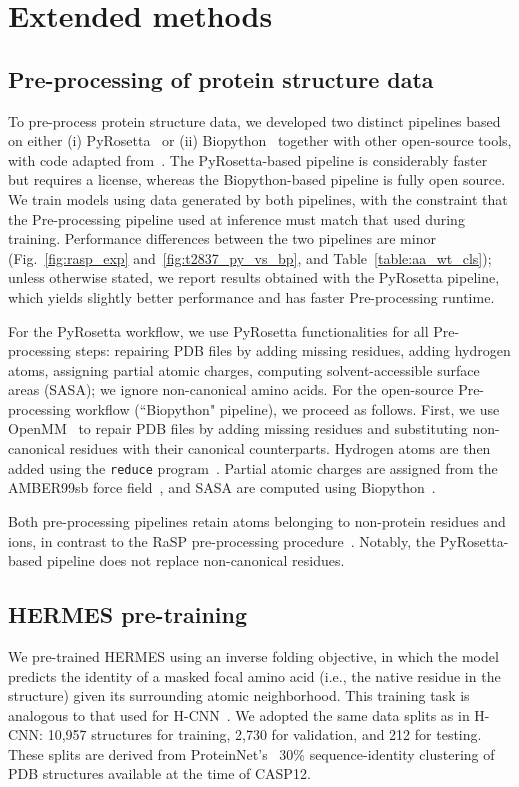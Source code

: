 
\section{Extended methods}


\subsection{Pre-processing of protein structure data}
To pre-process protein structure data, we developed two distinct pipelines based on either (i)
PyRosetta~\citep{chaudhury_pyrosetta_2010} or (ii) Biopython~\citep{cock_biopython_2009} together
with other open-source tools, with code adapted from~\citep{blaabjerg_rapid_2023}. The
PyRosetta-based pipeline is considerably faster but requires a license, whereas the Biopython-based
pipeline is fully open source. We train models using data generated by both pipelines, with the
constraint that the Pre-processing pipeline used at inference must match that used during training.
Performance differences between the two pipelines are minor (Fig.~\ref{fig:rasp_exp}
and~\ref{fig:t2837_py_vs_bp}, and Table~\ref{table:aa_wt_cls}); unless otherwise stated, we report
results obtained with the PyRosetta pipeline, which yields slightly better performance and has
faster Pre-processing runtime.

For the PyRosetta workflow, we use PyRosetta functionalities for all Pre-processing steps: repairing
PDB files by adding missing residues, adding hydrogen atoms, assigning partial atomic charges,
computing solvent-accessible surface areas (SASA); we ignore non-canonical amino acids.
For the open-source Pre-processing workflow (``Biopython" pipeline), we proceed as follows. First,
we use OpenMM~\citep{eastman_openmm_2013} to repair PDB files by adding missing residues and
substituting non-canonical residues with their canonical counterparts. Hydrogen atoms are then added
using the \texttt{reduce} program~\citep{word_asparagine_1999}. Partial atomic charges are assigned
from the AMBER99sb force field~\citep{ponder_force_2003}, and SASA are computed using
Biopython~\citep{cock_biopython_2009}.

Both pre-processing pipelines retain atoms belonging to non-protein residues and ions, in contrast
to the RaSP pre-processing procedure~\citep{blaabjerg_rapid_2023}. Notably, the PyRosetta-based
pipeline does not replace non-canonical residues.


\subsection{HERMES pre-training}
We pre-trained HERMES using an inverse folding objective, in which the model predicts the identity
of a masked focal amino acid (i.e., the native residue in the structure) given its surrounding
atomic neighborhood. This training task is analogous to that used for
H-CNN~\citep{pun_learning_2024}. We adopted the same data splits as in H-CNN: 10,957 structures for
training, 2,730 for validation, and 212 for testing. These splits are derived from
ProteinNet's~\citep{alquraishi_proteinnet_2019} 30\% sequence-identity clustering of PDB structures
available at the time of CASP12.

